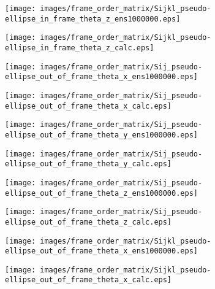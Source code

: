 \documentclass[a4paper,11pt,twoside,openright]{book}
\def\lthtmlcheckvsize{\ifdim\ht\sizebox<\vsize 
  \ifdim\wd\sizebox<\hsize\expandafter\hfill\fi \expandafter\vfill
  \else\expandafter\vss\fi}%
\begin{document}
{\newpage\clearpage
{}%
\texttt{[image: images/frame\_order\_matrix/Sijkl\_pseudo-ellipse\_in\_frame\_theta\_z\_ens1000000.eps]}%
\lthtmlpictureZ
\lthtmlcheckvsize\clearpage}

{\newpage\clearpage
{}%
\texttt{[image: images/frame\_order\_matrix/Sijkl\_pseudo-ellipse\_in\_frame\_theta\_z\_calc.eps]}%
\lthtmlpictureZ
\lthtmlcheckvsize\clearpage}

{\newpage\clearpage
{}%
\texttt{[image: images/frame\_order\_matrix/Sij\_pseudo-ellipse\_out\_of\_frame\_theta\_x\_ens1000000.eps]}%
\lthtmlpictureZ
\lthtmlcheckvsize\clearpage}

{\newpage\clearpage
{}%
\texttt{[image: images/frame\_order\_matrix/Sij\_pseudo-ellipse\_out\_of\_frame\_theta\_x\_calc.eps]}%
\lthtmlpictureZ
\lthtmlcheckvsize\clearpage}

{\newpage\clearpage
{}%
\texttt{[image: images/frame\_order\_matrix/Sij\_pseudo-ellipse\_out\_of\_frame\_theta\_y\_ens1000000.eps]}%
\lthtmlpictureZ
\lthtmlcheckvsize\clearpage}

{\newpage\clearpage
{}%
\texttt{[image: images/frame\_order\_matrix/Sij\_pseudo-ellipse\_out\_of\_frame\_theta\_y\_calc.eps]}%
\lthtmlpictureZ
\lthtmlcheckvsize\clearpage}

{\newpage\clearpage
{}%
\texttt{[image: images/frame\_order\_matrix/Sij\_pseudo-ellipse\_out\_of\_frame\_theta\_z\_ens1000000.eps]}%
\lthtmlpictureZ
\lthtmlcheckvsize\clearpage}

{\newpage\clearpage
{}%
\texttt{[image: images/frame\_order\_matrix/Sij\_pseudo-ellipse\_out\_of\_frame\_theta\_z\_calc.eps]}%
\lthtmlpictureZ
\lthtmlcheckvsize\clearpage}

{\newpage\clearpage
{}%
\texttt{[image: images/frame\_order\_matrix/Sijkl\_pseudo-ellipse\_out\_of\_frame\_theta\_x\_ens1000000.eps]}%
\lthtmlpictureZ
\lthtmlcheckvsize\clearpage}

{\newpage\clearpage
{}%
\texttt{[image: images/frame\_order\_matrix/Sijkl\_pseudo-ellipse\_out\_of\_frame\_theta\_x\_calc.eps]}%
\lthtmlpictureZ
\lthtmlcheckvsize\clearpage}
\end{document}
